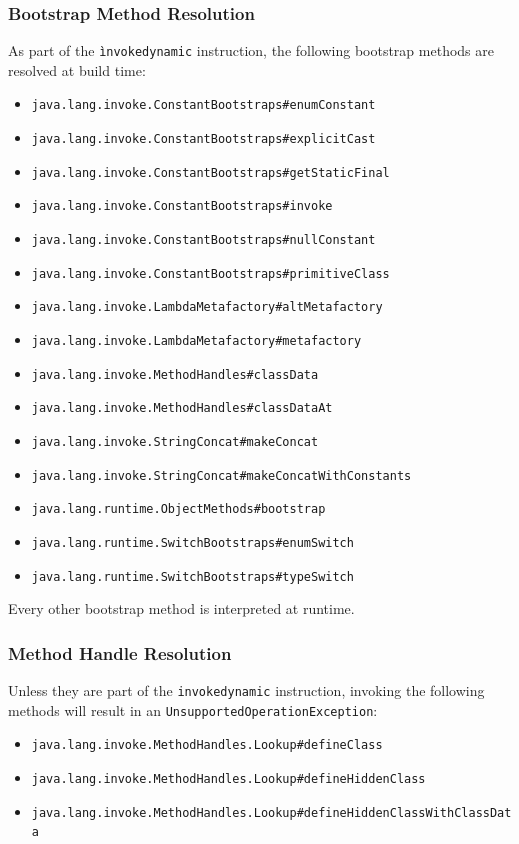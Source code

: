 \subsubsection{Bootstrap Method Resolution}\label{bootstrap_method_resolution}
As part of the \texttt{ìnvokedynamic} instruction, the following bootstrap methods are resolved at build time:
\begin{itemize}
    \item \texttt{java.lang.invoke.ConstantBootstraps\#enumConstant} 
    \item \texttt{java.lang.invoke.ConstantBootstraps\#explicitCast} 
    \item \texttt{java.lang.invoke.ConstantBootstraps\#getStaticFinal} 
    \item \texttt{java.lang.invoke.ConstantBootstraps\#invoke} 
    \item \texttt{java.lang.invoke.ConstantBootstraps\#nullConstant} 
    \item \texttt{java.lang.invoke.ConstantBootstraps\#primitiveClass} 
    \item \texttt{java.lang.invoke.LambdaMetafactory\#altMetafactory} 
    \item \texttt{java.lang.invoke.LambdaMetafactory\#metafactory} 
    \item \texttt{java.lang.invoke.MethodHandles\#classData} 
    \item \texttt{java.lang.invoke.MethodHandles\#classDataAt} 
    \item \texttt{java.lang.invoke.StringConcat\#makeConcat} 
    \item \texttt{java.lang.invoke.StringConcat\#makeConcatWithConstants} 
    \item \texttt{java.lang.runtime.ObjectMethods\#bootstrap} 
    \item \texttt{java.lang.runtime.SwitchBootstraps\#enumSwitch}
    \item \texttt{java.lang.runtime.SwitchBootstraps\#typeSwitch} 
\end{itemize}
Every other bootstrap method is interpreted at runtime.

\subsubsection{Method Handle Resolution}
Unless they are part of the \texttt{invokedynamic} instruction, invoking the following methods will result in an \texttt{UnsupportedOperationException}:
\begin{itemize}
    \item \texttt{java.lang.invoke.MethodHandles.Lookup\#defineClass} 
    \item \texttt{java.lang.invoke.MethodHandles.Lookup\#defineHiddenClass} 
    \item \texttt{java.lang.invoke.MethodHandles.Lookup\#defineHiddenClassWithClassData}
\end{itemize}

